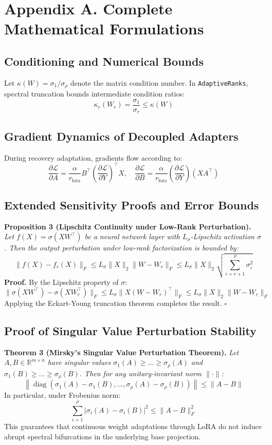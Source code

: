 \section*{Appendix A. Complete Mathematical Formulations}

\subsection*{Conditioning and Numerical Bounds}
Let $\kappa(W) = \sigma_1 / \sigma_\rho$ denote the matrix condition number. In \texttt{AdaptiveRanks}, spectral truncation bounds intermediate condition ratios:
\[
\kappa_r(W_r) = \frac{\sigma_1}{\sigma_r} \le \kappa(W)
\]

\subsection*{Gradient Dynamics of Decoupled Adapters}
During recovery adaptation, gradients flow according to:
\[
\frac{\partial \mathcal{L}}{\partial A} = \frac{\alpha}{r_{\text{lora}}} B^\top \left( \frac{\partial \mathcal{L}}{\partial Y} \right)^\top X, \quad \frac{\partial \mathcal{L}}{\partial B} = \frac{\alpha}{r_{\text{lora}}} \left( \frac{\partial \mathcal{L}}{\partial Y} \right) (X A^\top)
\]

\subsection*{Extended Sensitivity Proofs and Error Bounds}
\textbf{Proposition 3 (Lipschitz Continuity under Low-Rank Perturbation).} \textit{Let $f(X) = \sigma(X W^\top)$ be a neural network layer with $L_\sigma$-Lipschitz activation $\sigma$. Then the output perturbation under low-rank factorization is bounded by:}
\[
\|f(X) - f_r(X)\|_F \le L_\sigma \|X\|_2 \|W - W_r\|_F \le L_\sigma \|X\|_2 \sqrt{\sum_{i=r+1}^\rho \sigma_i^2}
\]
\textbf{Proof.} By the Lipschitz property of $\sigma$:
\[
\|\sigma(X W^\top) - \sigma(X W_r^\top)\|_F \le L_\sigma \|X (W - W_r)^\top\|_F \le L_\sigma \|X\|_2 \|W - W_r\|_F
\]
Applying the Eckart-Young truncation theorem completes the result. $\square$

\subsection*{Proof of Singular Value Perturbation Stability}
\textbf{Theorem 3 (Mirsky's Singular Value Perturbation Theorem).} \textit{Let $A, B \in \mathbb{R}^{m \times n}$ have singular values $\sigma_1(A) \ge \dots \ge \sigma_\rho(A)$ and $\sigma_1(B) \ge \dots \ge \sigma_\rho(B)$. Then for any unitary-invariant norm $\|\cdot\|$:}
\[
\left\| \operatorname{diag}(\sigma_1(A) - \sigma_1(B), \dots, \sigma_\rho(A) - \sigma_\rho(B)) \right\| \le \|A - B\|
\]
In particular, under Frobenius norm:
\[
\sum_{i=1}^\rho |\sigma_i(A) - \sigma_i(B)|^2 \le \|A - B\|_F^2
\]
This guarantees that continuous weight adaptations through LoRA do not induce abrupt spectral bifurcations in the underlying base projection.

